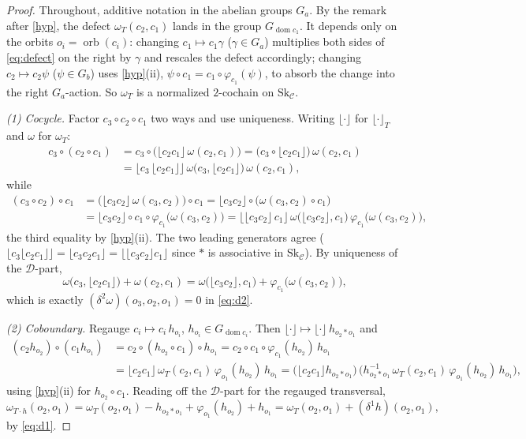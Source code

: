 \documentclass[11pt]{article}
\theoremstyle{definition}
\newcommand{\C}{\mathcal{C}}
\newcommand{\D}{\mathcal{D}}
\newcommand{\Sk}{\mathrm{Sk}}
\newcommand{\dom}{\operatorname{dom}}
\newcommand{\orb}{\operatorname{orb}}
\newcommand{\flr}[1]{\lfloor #1 \rfloor}
\newcommand{\1}{\mathbf{1}}
\begin{document}
\begin{proof}
Throughout, additive notation in the abelian groups $G_a$. By the remark after
\ref{hyp}, the defect $\omega_T(c_2,c_1)$ lands in the group $G_{\dom c_1}$. It
depends only on the orbits $o_i=\orb(c_i)$: changing $c_1\mapsto c_1\gamma$
($\gamma\in G_a$) multiplies both sides of \eqref{eq:defect} on the right by
$\gamma$ and rescales the defect accordingly; changing $c_2\mapsto c_2\psi$
($\psi\in G_b$) uses \ref{hyp}(ii), $\psi\circ c_1=c_1\circ\varphi_{c_1}(\psi)$, to
absorb the change into the right $G_a$-action. So $\omega_T$ is a normalized
$2$-cochain on $\Sk_\C$.

\emph{(1) Cocycle.} Factor $c_3\circ c_2\circ c_1$ two ways and use uniqueness.
Writing $\flr{\cdot}$ for $\flr{\cdot}_T$ and $\omega$ for $\omega_T$:
\begin{align*}
c_3\circ(c_2\circ c_1)
&=c_3\circ\big(\flr{c_2c_1}\,\omega(c_2,c_1)\big)
 =\big(c_3\circ\flr{c_2c_1}\big)\,\omega(c_2,c_1)\\
&=\flr{c_3\,\flr{c_2c_1}}\,\omega\!\big(c_3,\flr{c_2c_1}\big)\,\omega(c_2,c_1),
\end{align*}
while
\begin{align*}
(c_3\circ c_2)\circ c_1
&=\big(\flr{c_3c_2}\,\omega(c_3,c_2)\big)\circ c_1
 =\flr{c_3c_2}\circ\big(\omega(c_3,c_2)\circ c_1\big)\\
&=\flr{c_3c_2}\circ c_1\circ\varphi_{c_1}\!\big(\omega(c_3,c_2)\big)
 =\flr{\flr{c_3c_2}\,c_1}\,\omega\!\big(\flr{c_3c_2},c_1\big)\,
   \varphi_{c_1}\!\big(\omega(c_3,c_2)\big),
\end{align*}
the third equality by \ref{hyp}(ii). The two leading generators agree
($\flr{c_3\flr{c_2c_1}}=\flr{c_3c_2c_1}=\flr{\flr{c_3c_2}c_1}$ since $\ast$ is
associative in $\Sk_\C$). By uniqueness of the $\D$-part,
\[
   \omega\!\big(c_3,\flr{c_2c_1}\big)+\omega(c_2,c_1)
   =\omega\!\big(\flr{c_3c_2},c_1\big)+\varphi_{c_1}\!\big(\omega(c_3,c_2)\big),
\]
which is exactly $(\delta^2\omega)(o_3,o_2,o_1)=0$ in \eqref{eq:d2}.

\emph{(2) Coboundary.} Regauge $c_i\mapsto c_i\,h_{o_i}$, $h_{o_i}\in G_{\dom c_i}$.
Then $\flr{\cdot}\mapsto\flr{\cdot}\,h_{o_2\ast o_1}$ and
\begin{align*}
(c_2 h_{o_2})\circ(c_1 h_{o_1})
&=c_2\circ(h_{o_2}\circ c_1)\circ h_{o_1}
 =c_2\circ c_1\circ\varphi_{c_1}(h_{o_2})\,h_{o_1}\\
&=\flr{c_2c_1}\,\omega_T(c_2,c_1)\,\varphi_{o_1}(h_{o_2})\,h_{o_1}
 =\big(\flr{c_2c_1}h_{o_2\ast o_1}\big)\,
  \big(h_{o_2\ast o_1}^{-1}\,\omega_T(c_2,c_1)\,\varphi_{o_1}(h_{o_2})\,h_{o_1}\big),
\end{align*}
using \ref{hyp}(ii) for $h_{o_2}\circ c_1$. Reading off the $\D$-part for the
regauged transversal,
\[
   \omega_{T\cdot h}(o_2,o_1)=\omega_T(o_2,o_1)-h_{o_2\ast o_1}
     +\varphi_{o_1}(h_{o_2})+h_{o_1}
   =\omega_T(o_2,o_1)+(\delta^1 h)(o_2,o_1),
\]
by \eqref{eq:d1}.


\end{proof}
\end{document}
